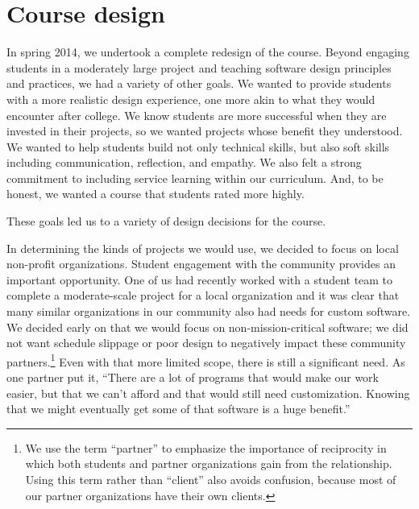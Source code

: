\section{Course design}


In spring 2014, we undertook a complete redesign of the course.
Beyond engaging students in a moderately large project and teaching
software design principles and practices, we had a variety of other
goals.  We wanted to provide students with a more realistic design
experience, one more akin to what they would encounter after college.
We know students are more successful when they are invested in their
projects, so we wanted projects whose benefit they understood.  We
wanted to help students build not only technical skills, but also
soft skills including communication, reflection, and empathy.  
We also felt a strong commitment to
including service learning within our curriculum.  And, to be
honest, we wanted a course that students rated more highly.

These goals led us to a variety of design decisions for the course.

In determining the kinds of projects we would use, we decided to
focus on local non-profit organizations.  Student engagement with
the community provides an important opportunity.  One of us had
recently worked with a student team to complete a moderate-scale
project for a local organization and it was clear that many similar
organizations in our community also had needs for custom software.
We decided early on that we would focus on non-mission-critical
software; we did not want schedule slippage or poor design to
negatively impact these community partners.\footnote{We use the term ``partner'' to emphasize the importance of
reciprocity in which both students and partner organizations gain
from the relationship.  Using this term rather than ``client'' also
avoids confusion, because most of our partner organizations have
their own clients.} Even with that more limited scope, there is
still a significant need.  As one partner put it, ``There are a lot
of programs that would make our work easier, but that we can't
afford and that would still need customization.  Knowing that we
might eventually get some of that software is a huge benefit.''

